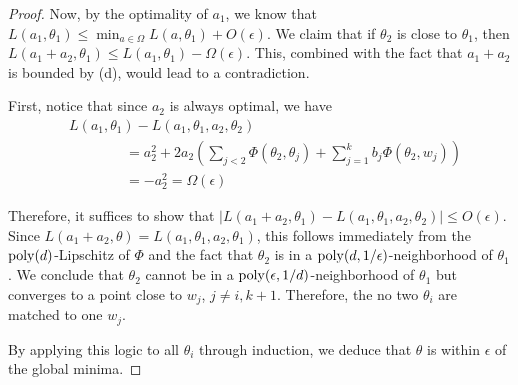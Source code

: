 \documentclass[11pt]{article}
\begin{document}
\begin{proof}
Now, by the optimality of $a_1$, we know that $L(a_1,\theta_1) \leq \min_{a \in \Omega} L(a,\theta_1) + O(\epsilon)$. We claim that if $\theta_2$ is close to $\theta_1$, then $L(a_1+a_2,\theta_1) \leq L(a_1,\theta_1) - \Omega(\epsilon)$. This, combined with the fact that $a_1 + a_2$ is bounded by \poly(d), would lead to a contradiction.

First, notice that since $a_2$ is always optimal, we have
\begin{align*}
& L(a_1,\theta_1) - L(a_1,\theta_1,a_2,\theta_2) \\
& \qquad \qquad = a_2^2 + 2a_2 (\sum_{j < 2} \Phi(\theta_2,\theta_j) + \sum_{j=1}^k b_j \Phi(\theta_2,w_j)) \\
& \qquad \qquad = -a_2^2 = \Omega(\epsilon)
\end{align*}

Therefore, it suffices to show that $|L(a_1+a_2,\theta_1) - L(a_1,\theta_1,a_2,\theta_2) | \leq O(\epsilon)$. Since $L(a_1+a_2,\theta) = L(a_1,\theta_1,a_2,\theta_1)$, this follows immediately from the $\mathrm{poly}(d)$-Lipschitz of $\Phi$ and the fact that $\theta_2$ is in a $\mathrm{poly}(d,1/\epsilon)$-neighborhood of $\theta_1$. We conclude that $\theta_2$ cannot be in a $\mathrm{poly}(\epsilon,1/d)$-neighborhood of $\theta_1$ but converges to a point close to $w_{j}$, $j\neq i,k+1$. Therefore, the no two $\theta_i$ are matched to one $w_j$. 

By applying this logic to all $\theta_i$ through induction, we deduce that $\theta$ is within $\epsilon$ of the global minima.
\end{proof}
\fi
\end{document}
